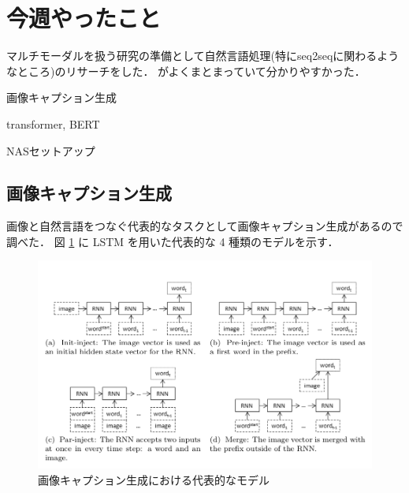 \documentclass[twocolumn]{ujarticle}   %
\begin{document}

	\section{今週やったこと}
	マルチモーダルを扱う研究の準備として自然言語処理(特にseq2seqに関わるようなところ)のリサーチをした．\cite{nlp-research} がよくまとまっていて分かりやすかった．

	\begin{itemize}{
		\item{画像キャプション生成}
		\item{transformer, BERT}
		\item{NASセットアップ}
	}
	\end{itemize}

	\subsection{画像キャプション生成}
	画像と自然言語をつなぐ代表的なタスクとして画像キャプション生成があるので調べた．
	図 \ref{fig:captioning} に LSTM を用いた代表的な 4 種類のモデルを示す．

	\begin{figure}[h]
		\centering
		\includegraphics[width=1.0\columnwidth]{1.png}
		\caption{画像キャプション生成における代表的なモデル}
		\label{fig:captioning}
	\end{figure}
\end{document}
